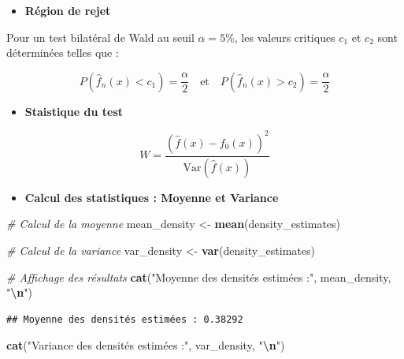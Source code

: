\documentclass[
  12pt,
]{article}
\newenvironment{Shaded}{\begin{snugshade}}{\end{snugshade}}
\newcommand{\CommentTok}[1]{\textcolor[rgb]{0.56,0.35,0.01}{\textit{#1}}}
\newcommand{\FunctionTok}[1]{\textcolor[rgb]{0.13,0.29,0.53}{\textbf{#1}}}
\newcommand{\NormalTok}[1]{#1}
\newcommand{\OtherTok}[1]{\textcolor[rgb]{0.56,0.35,0.01}{#1}}
\newcommand{\SpecialCharTok}[1]{\textcolor[rgb]{0.81,0.36,0.00}{\textbf{#1}}}
\newcommand{\StringTok}[1]{\textcolor[rgb]{0.31,0.60,0.02}{#1}}
\providecommand{\tightlist}{%
  \setlength{\itemsep}{0pt}\setlength{\parskip}{0pt}}
\begin{document}
\begin{itemize}
\tightlist
\item
  \textbf{Région de rejet}
\end{itemize}

Pour un test bilatéral de Wald au seuil \(\alpha = 5\%\), les valeurs
critiques \(c_1\) et \(c_2\) sont déterminées telles que :

\[
P\left( \hat{f}_n(x) < c_1 \right) = \dfrac{\alpha}{2} \quad \text{et} \quad P\left( \hat{f}_n(x) > c_2 \right) = \dfrac{\alpha}{2}
\]

\begin{itemize}
\tightlist
\item
  \textbf{Staistique du test}
\end{itemize}

\[
W = \frac{(\hat{f}(x) - f_0(x))^2}{\text{Var}(\hat{f}(x))}
\]

\begin{itemize}
\tightlist
\item
  \textbf{Calcul des statistiques : Moyenne et Variance}
\end{itemize}

\begin{Shaded}
\begin{Highlighting}[]
\CommentTok{\# Calcul de la moyenne}
\NormalTok{mean\_density }\OtherTok{\textless{}{-}} \FunctionTok{mean}\NormalTok{(density\_estimates)}

\CommentTok{\# Calcul de la variance}
\NormalTok{var\_density }\OtherTok{\textless{}{-}} \FunctionTok{var}\NormalTok{(density\_estimates)}

\CommentTok{\# Affichage des résultats}
\FunctionTok{cat}\NormalTok{(}\StringTok{"Moyenne des densités estimées :"}\NormalTok{, mean\_density, }\StringTok{"}\SpecialCharTok{\textbackslash{}n}\StringTok{"}\NormalTok{)}
\end{Highlighting}
\end{Shaded}

\begin{verbatim}
## Moyenne des densités estimées : 0.38292
\end{verbatim}

\begin{Shaded}
\begin{Highlighting}[]
\FunctionTok{cat}\NormalTok{(}\StringTok{"Variance des densités estimées :"}\NormalTok{, var\_density, }\StringTok{"}\SpecialCharTok{\textbackslash{}n}\StringTok{"}\NormalTok{)}
\end{Highlighting}
\end{Shaded}
\end{document}
